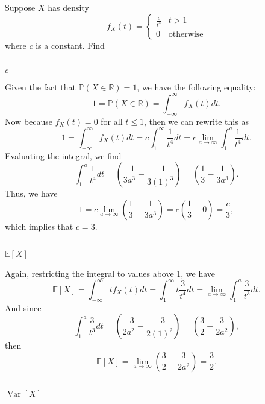 \documentclass[12pt]{article}
\newenvironment{problem}
    {\begin{lrbox}{\mybox}\begin{minipage}{0.98\textwidth}}
    {\end{minipage}\end{lrbox}\framebox[\textwidth]{\usebox{\mybox}}}
\newcommand{\R}{\mathbb{R}}
\renewcommand{\P}{\mathbb{P}}
\newcommand{\E}{\mathbb{E}}
\newcommand{\Var}{\operatorname{Var}}
\begin{document}
\newpage
\section{}
\begin{problem}
    Suppose $X$ has density
    \[
        f_X(t) = \begin{cases}
            \frac{c}{t^4}   & t > 1 \\
            0               & \text{otherwise}
        \end{cases}
    \]
    where $c$ is a constant. Find
\end{problem}

\subsection{}
\begin{problem}
    $c$
\end{problem}
\medskip

Given the fact that $\P(X \in \R) = 1$, we have the following equality:
\[
    1 = \P(X \in \R) = \int_{-\infty}^{\infty} f_X(t) dt.
\]
Now because $f_X(t) = 0$ for all $t \leq 1$, then we can rewrite this as
\[
    1 = \int_{-\infty}^\infty f_X(t) dt = c \int_1^\infty \frac{1}{t^4} dt = c \lim_{a \to \infty} \int_1^a \frac{1}{t^4} dt.
\]
Evaluating the integral, we find
\[
    \int_1^a \frac{1}{t^4} dt = \left(\frac{-1}{3a^3} - \frac{-1}{3(1)^3} \right) = \left( \frac13 - \frac1{3a^3} \right).
\]
Thus, we have
\[
    1 = c \lim_{a \to \infty} \left( \frac13 - \frac1{3a^3} \right) = c\left( \frac13 - 0 \right) = \frac{c}{3},
\]
which implies that $c = 3$.


\subsection{}
\begin{problem}
    $\E[X]$
\end{problem}
\medskip

Again, restricting the integral to values above 1, we have
\[
    \E[X] = \int_{-\infty}^\infty t f_X(t) dt = \int_1^\infty t \frac{3}{t^4} dt = \lim_{a \to \infty} \int_1^a \frac3{t^3} dt.
\]
And since
\[
    \int_1^a \frac3{t^3} dt = \left( \frac{-3}{2a^2} - \frac{-3}{2(1)^2} \right) = \left( \frac32 - \frac3{2a^2} \right),
\]
then
\[
    \E[X] = \lim_{a \to \infty} \left( \frac32 - \frac3{2a^2} \right) = \frac32.
\]

\subsection{}
\begin{problem}
    $\Var[X]$
\end{problem}
\medskip
\end{document}
